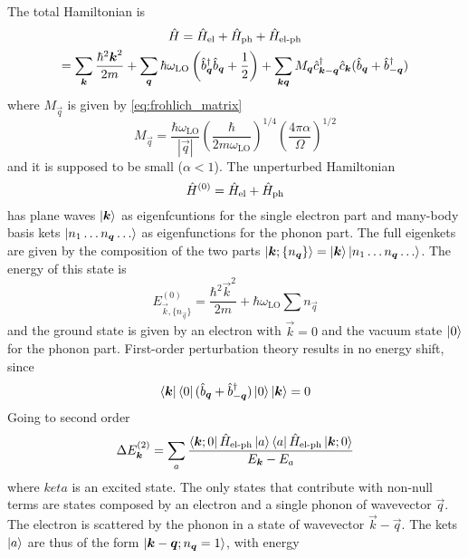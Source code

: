 The total Hamiltonian is
\begin{multline}
    \hat{H} = \hat{H}_\text{el} + \hat{H}_\text{ph} + \hat{H}_\text{el-ph}
    \\ = \sum_{\mathbf{\boldsymbol{k}}} \frac{\hbar^2\mathbf{\boldsymbol{k}}^2}{2m}
    + \sum_{\mathbf{\boldsymbol{q}}} \hbar \omega_\text{LO} \left( \hat{b}^\dagger_{ \mathbf{\boldsymbol{q}}} \hat{b}_{ \mathbf{\boldsymbol{q}}} + \frac{1}{2} \right)
    + \sum_{\mathbf{\boldsymbol{k}}\mathbf{\boldsymbol{q}}} M_{\mathbf{\boldsymbol{q}}}\hat{c}^\dagger_{\mathbf{\boldsymbol{k}}-\mathbf{\boldsymbol{q}}}\hat{c}_{\mathbf{\boldsymbol{k}}} (\hat{b}_{\mathbf{\boldsymbol{q}}} + \hat{b}^\dagger_{-\mathbf{\boldsymbol{q}}})
\end{multline}
where $M_\vec{q}$ is given by \cref{eq:frohlich_matrix}
\begin{equation} \label{eq:frohlich_matrix_perturbation}
    M_\vec{q} =  \frac{\hbar \omega_\text{LO}}{|\vec{q}|} \left(\frac{\hbar}{2m\omega_\text{LO}}\right)^{1/4} \left(\frac{4\pi\alpha}{\Omega}\right)^{1/2}
\end{equation}
and it is supposed to be small ($\alpha < 1$). The unperturbed Hamiltonian
\begin{equation}
    \hat{H}^{(0)} = \hat{H}_\text{el} + \hat{H}_\text{ph}
\end{equation}
has plane waves $\ket{\mathbf{\boldsymbol{k}}}$ as eigenfcuntions for the single  electron part and many-body basis kets $\ket{n_1 \dots n_{\mathbf{\boldsymbol{q}}} \dots}$ as eigenfunctions for the phonon part. The full eigenkets are given by the composition of the two parts $\ket{\mathbf{\boldsymbol{k}}; \{n_{\mathbf{\boldsymbol{q}}}\}} = \ket{\mathbf{\boldsymbol{k}}}\ket{n_1 \dots n_{\mathbf{\boldsymbol{q}}} \dots}$. The energy of this state is
\begin{equation}
    E_{\vec{k}, \{n_\vec{q}\}}^{(0)} = \frac{\hbar^2\vec{k}^2}{2m} + \hbar \omega_\text{LO}\sum n_\vec{q}
\end{equation}
and the ground state is given by an electron with $\vec{k}=0$ and the vacuum state $\ket{0}$ for the phonon part.
First-order perturbation theory results in no energy shift, since
\begin{equation}
    \bra{\mathbf{\boldsymbol{k}}}\bra{0}(\hat{b}_{\mathbf{\boldsymbol{q}}} + \hat{b}^\dagger_{-\mathbf{\boldsymbol{q}}})\ket{0}\ket{\mathbf{\boldsymbol{k}}} = 0
\end{equation}
Going to second order
\begin{equation}
    \Delta E_{\mathbf{\boldsymbol{k}}}^{(2)} = \sum_a \frac{\bra{\mathbf{\boldsymbol{k}};0}\hat{H}_\text{el-ph}\ket{a}\bra{a}\hat{H}_\text{el-ph}\ket{\mathbf{\boldsymbol{k}};0}}{E_{\mathbf{\boldsymbol{k}}} - E_a}
\end{equation}
where $ket{a}$ is an excited state. The only states that contribute with non-null terms are states composed by an electron and a single phonon of wavevector $\vec{q}$. The electron is scattered by the phonon in a state of wavevector $\vec{k} - \vec{q}$. The kets $\ket{a}$ are thus of the form $\ket{\mathbf{\boldsymbol{k}}-\mathbf{\boldsymbol{q}}; n_{\mathbf{\boldsymbol{q}}}=1}$, with energy
